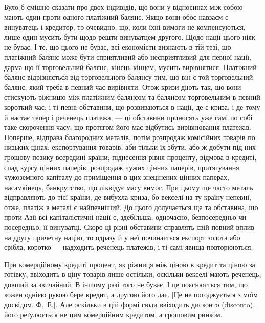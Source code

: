 Було б смішно сказати про двох індивідів, що вони у відносинах між собою
мають один проти одного платіжний балянс. Якщо вони обоє навзаєм є
винуватець і кредитор, то очевидно, що, коли їхні вимоги не компенсуються,
лише один мусить бути щодо решти винуватцем другого. Щодо нації цього
ніяк не буває. І те, що цього не буває, всі економісти визнають в тій тезі,
що платіжний балянс може бути сприятливий або несприятливий для певної
нації, дарма що її торговельний балянс, кінець-кінцем, мусить вирівнятися.
Платіжний балянс відрізняється від торговельного балянсу тим, що він є той
торговельний балянс, який треба в певний час вирівняти. Отож кризи діють так,
що вони стискують ріжницю між платіжним балянсом та балянсом торговельним
в певний короткий час; і ті певні обставини, що розвиваються в нації, де є
криза, і де тому й настає тепер і реченець платежа, — ці обставини приносять уже
самі по собі таке скорочення часу, що протягом його має відбутись вирівнювання
платежів. Поперше, відправа благородних металів, потім розпродаж комісійних
товарів по низьких цінах; експортування товарів, аби тільки їх збути, або ж
добути під них грошову позику всередині країни; піднесення рівня проценту,
відмова в кредиті, спад курсу цінних паперів, розпродаж чужих цінних паперів,
притягування чужоземного капіталу до приміщення в цих знецінених цінних
паперах, насамкінець, банкрутство, що ліквідує масу вимог. При цьому ще часто
металь відправляють до тієї країни, де вибухла криза, бо векселі на ту країну
непевні, отже, платіж в металі є найпевніший. До цього долучається ще та
обставина, що проти Азії всі капіталістичні нації є, здебільша, одночасно, безпосередньо
чи посередньо, її винуватці. Скоро ці різні обставини справлять свій повний
вплив на другу причетну націю, то одразу й у неї починається експорт золота або
срібла, коротко — надходить реченець платежів, і ті самі явища повторюються.

При комерційному кредиті процент, як ріжниця між ціною в кредит та
ціною за готівку, ввіходить в ціну товарів лише остільки, оскільки векселі
мають реченець, довший за звичайний. В іншому разі того не буває. І це пояснюється
тим, що кожен однією рукою бере кредит, а другою його дає. [Це не погоджується
з моїм досвідом. Ф.~Е.]. Але оскільки в цій формі сюди ввіходить
дисконто (disconto), його реґулюється не цим комерційним кредитом, а грошовим
ринком.

